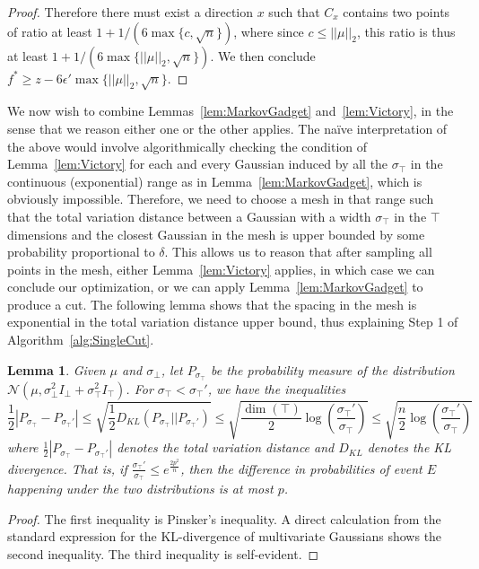 \documentclass[11pt,letter]{article}
\newcommand{\Normal}{\mathcal{N}}
\newcommand{\perr}{\delta}
\newcounter{nTheorems}
\numberwithin{nTheorems}{section}
\newtheorem{lemma}[nTheorems]{Lemma}
\begin{document}
\begin{proof}
  Therefore there must exist a direction $x$ such that $C_x$ contains two points of ratio at least $1+1/(6\max\{c,\sqrt{n}\})$, where since $c\leq ||\mu||_2$, this ratio is thus at least $1+1/(6\max\{||\mu||_2,\sqrt{n}\})$. We then conclude $f^\ast\geq z-6\epsilon'\max\{||\mu||_2,\sqrt{n}\}$.
\end{proof}

We now wish to combine Lemmas~\ref{lem:MarkovGadget} and~\ref{lem:Victory}, in the sense that we reason either one or the other applies.
The na\"{i}ve interpretation of the above would involve algorithmically checking the condition of Lemma~\ref{lem:Victory} for each and every Gaussian induced by all the $\sigma_\top$ in the continuous (exponential) range as in Lemma~\ref{lem:MarkovGadget}, which is obviously impossible.
Therefore, we need to choose a mesh in that range such that the total variation distance between a Gaussian with a width $\sigma_\top$ in the $\top$ dimensions and the closest Gaussian in the mesh is upper bounded by some probability proportional to $\perr$.
This allows us to reason that after sampling all points in the mesh, either Lemma~\ref{lem:Victory} applies, in which case we can conclude our optimization, or we can apply Lemma~\ref{lem:MarkovGadget} to produce a cut.
The following lemma shows that the spacing in the mesh is exponential in the total variation distance upper bound, thus explaining Step 1 of Algorithm~\ref{alg:SingleCut}.

\begin{lemma}
\label{lem:Pinsker}
Given $\mu$ and $\sigma_\bot$, let $P_{\sigma_\top}$ be the probability measure of the distribution $\Normal(\mu, \sigma_\bot^2 I_\bot + \sigma_\top^2 I_\top)$.
For $\sigma_\top < \sigma_\top'$, we have the inequalities
$$ \frac{1}{2}|P_{\sigma_\top} - P_{\sigma_\top'}| \le \sqrt{\frac{1}{2}D_{KL}(P_{\sigma_\top} || P_{\sigma_\top'})} \le \sqrt{\frac{\dim(\top)}{2}\log\left(\frac{\sigma_\top'}{\sigma_\top}\right)} \le \sqrt{\frac{n}{2}\log\left(\frac{\sigma_\top'}{\sigma_\top}\right)} $$
where $\frac{1}{2}|P_{\sigma_\top} - P_{\sigma_\top'}|$ denotes the \emph{total variation distance} and $D_{KL}$ denotes the \emph{KL divergence}.
That is, if $\frac{\sigma_\top'}{\sigma_\top} \le e^{\frac{2p^2}{n}}$, then the difference in probabilities of event $E$ happening under the two distributions is at most $p$.
\end{lemma}

\begin{proof}
The first inequality is Pinsker's inequality.
A direct calculation from the standard expression for the KL-divergence of multivariate Gaussians shows the second inequality.
The third inequality is self-evident.
\end{proof}
\end{document}
